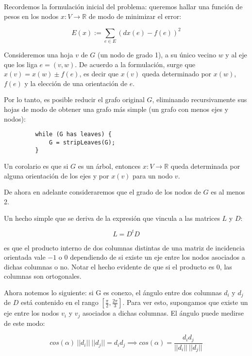 \documentclass[10pt, a4paper, twocolumn]{article} %
\begin{document}
Recordemos la formulación inicial del problema: queremos hallar una 
función de pesos en los nodos $x: V \rightarrow \mathbb{R}$ de modo de 
minimizar el error:

$$E(x) := \sum_{e \in E} (dx(e) - f(e))^2$$

Consideremos una hoja $v$ de $G$ (un nodo de grado 1), a su único 
vecino $w$ y al eje que los liga $e=(v,w)$. De acuerdo a la formulación, 
surge que $x(v) = x(w) \pm f(e)$, es decir que $x(v)$ queda 
determinado por $x(w)$, $f(e)$ y la elección de una orientación de $e$.

\smallskip

Por lo tanto, es posible reducir el grafo original $G$, eliminando 
recursivamente sus  hojas de modo de obtener una grafo más simple (un 
grafo con menos ejes y nodos):

\begin{verbatim}
         while (G has leaves) {
             G = stripLeaves(G);
         }
\end{verbatim}

Un corolario es que si $G$ es un árbol, entonces $x: V 
\rightarrow \mathbb{R}$ queda determinada por alguna orientación de 
los ejes y por $x(v)$ para un nodo $v$.

\smallskip

De ahora en adelante consideraremos que el grado de los nodos de $G$ es 
al menos 2.
 
\bigskip


Un hecho simple que se deriva de la expresión que vincula a las matrices 
$L$ y $D$:

$$L = D^t D$$

es que el producto interno de dos columnas distintas de una matriz de 
incidencia orientada vale $-1$ o $0$ dependiendo de si existe un eje 
entre los nodos asociados a dichas columnas o no. Notar el hecho 
evidente de que si el producto es $0$, las columnas son ortogonales.

\smallskip

Ahora notemos lo siguiente: si G es conexo, el ángulo entre dos 
columnas $d_i$ y $d_j$ de $D$ está contenido en el rango 
$[\frac{\pi}{2},\frac{2\pi}{3}]$. Para ver esto, supongamos que existe 
un eje entre los nodos $v_i$ y $v_j$ asociados a dichas columnas. 
El ángulo puede medirse de este modo:

$$cos(\alpha) \ ||d_i|| \ ||d_j||= d_i  d_j \implies cos(\alpha) = 
\frac{d_i d_j}{||d_i|| \ ||d_j||}$$
\end{document}
